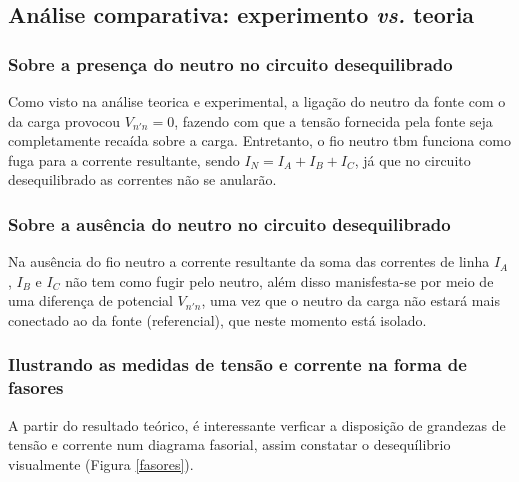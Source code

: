 \documentclass[a4paper,12pt,oneside,openany,table,xcdraw]{article}
\begin{document}
\vspace{0.2cm}

\subsection{Análise comparativa: experimento \emph{vs.} teoria}
\subsubsection{Sobre a presença do neutro no circuito desequilibrado}
Como visto na análise teorica e experimental, a ligação do neutro da fonte com o da carga provocou $V_{n'n}=0$, fazendo com que a tensão fornecida pela fonte seja completamente recaída sobre a carga. Entretanto, o fio neutro tbm funciona como fuga para a corrente resultante, sendo $I_N=I_A+I_B+I_C$, já que no circuito desequilibrado as correntes não se anularão. 

\subsubsection{Sobre a ausência do neutro no circuito desequilibrado}
Na ausência do fio neutro a corrente resultante da soma das correntes de linha $I_A$, $I_B$ e $I_C$ não tem como fugir pelo neutro, além disso manisfesta-se por meio de uma diferença de potencial $V_{n'n}$, uma vez que o neutro da carga não estará mais conectado ao da fonte (referencial), que neste momento está isolado.

\subsubsection{Ilustrando as medidas de tensão e corrente na forma de fasores}
A partir do resultado teórico, é interessante verficar a disposição de grandezas de tensão e corrente num diagrama fasorial, assim constatar o desequílibrio visualmente (Figura \ref{fasores}).
\end{document}
